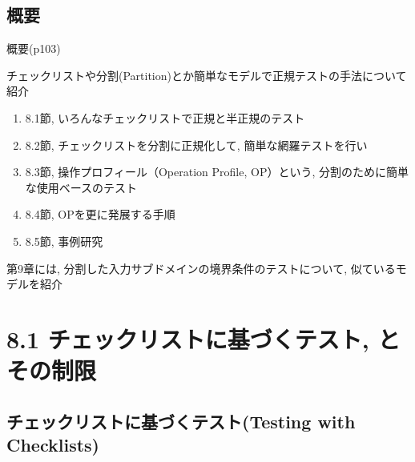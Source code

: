 \subsection{概要}
\begin{frame}{概要(p103)}


チェックリストや分割(Partition)とか簡単なモデルで正規テストの手法について紹介

\begin{enumerate}
\item 8.1節, いろんなチェックリストで正規と半正規のテスト
\item 8.2節, チェックリストを分割に正規化して, 簡単な網羅テストを行い 
\item 8.3節, 操作プロフィール（Operation Profile, OP）という, 分割のために簡単な使用ベースのテスト
\item 8.4節, OPを更に発展する手順
\item 8.5節, 事例研究 
\end{enumerate}

第9章には, 分割した入力サブドメインの境界条件のテストについて, 似ているモデルを紹介

\end{frame}

\section{8.1 チェックリストに基づくテスト, とその制限}
\subsection{チェックリストに基づくテスト(Testing with Checklists)}

